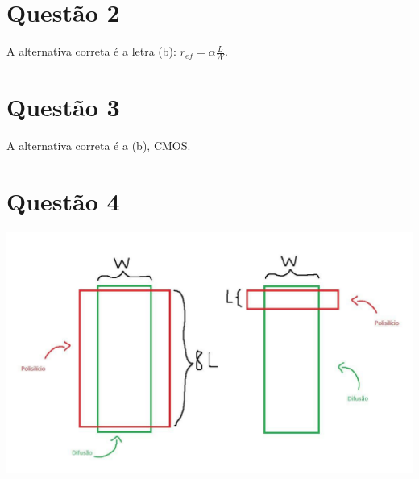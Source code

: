 \documentclass[11pt]{article}
\begin{document}
\section{Questão 2}
\label{sec:orge36777e}
A alternativa correta é a letra (b): \(r_{ef} = \alpha\frac{L}{W}\).
\section{Questão 3}
\label{sec:orgdac0190}
A alternativa correta é a (b), CMOS.
\section{Questão 4}
\label{sec:org9547be1}
\begin{center}
\includegraphics[width=.9\linewidth]{transistors.jpg}
\end{center}
\end{document}
